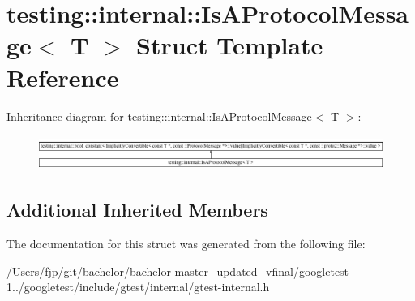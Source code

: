 \hypertarget{structtesting_1_1internal_1_1_is_a_protocol_message}{}\section{testing\+:\+:internal\+:\+:Is\+A\+Protocol\+Message$<$ T $>$ Struct Template Reference}
\label{structtesting_1_1internal_1_1_is_a_protocol_message}
Inheritance diagram for testing\+:\+:internal\+:\+:Is\+A\+Protocol\+Message$<$ T $>$\+:\begin{figure}[H]
\begin{center}
\leavevmode
\includegraphics[height=1.144024cm]{structtesting_1_1internal_1_1_is_a_protocol_message}
\end{center}
\end{figure}
\subsection*{Additional Inherited Members}


The documentation for this struct was generated from the following file\+:\begin{DoxyCompactItemize}
\item 
/\+Users/fjp/git/bachelor/bachelor-\/master\+\_\+updated\+\_\+vfinal/googletest-\/1../googletest/include/gtest/internal/gtest-\/internal.\+h\end{DoxyCompactItemize}
